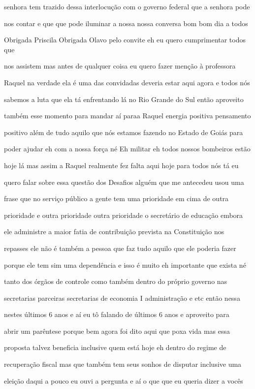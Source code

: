 \documentclass[a4paper,12pt]{article}
\begin{document}
senhora tem trazido dessa interlocução com o governo federal que a senhora pode

nos contar e que que pode iluminar a nossa nossa conversa bom bom dia a todos

Obrigada Priscila Obrigada Olavo pelo convite eh eu quero cumprimentar todos que

nos assistem mas antes de qualquer coisa eu quero fazer menção à professora

Raquel na verdade ela é uma das convidadas deveria estar aqui agora e todos nós

sabemos a luta que ela tá enfrentando lá no Rio Grande do Sul então aproveito

também esse momento para mandar aí paraa Raquel energia positiva pensamento

positivo além de tudo aquilo que nós estamos fazendo no Estado de Goiás para

poder ajudar eh com a nossa força né Eh militar eh todos nossos bombeiros estão

hoje lá mas assim a Raquel realmente fez falta aqui hoje para todos nós tá eu

quero falar sobre essa questão dos Desafios alguém que me antecedeu usou uma

frase que no serviço público a gente tem uma prioridade em cima de outra

prioridade e outra prioridade outra prioridade o secretário de educação embora

ele administre a maior fatia de contribuição prevista na Constituição nos

repasses ele não é também a pessoa que faz tudo aquilo que ele poderia fazer

porque ele tem sim uma dependência e isso é muito eh importante que exista né

tanto dos órgãos de controle como também dentro do próprio governo nas

secretarias parceiras secretarias de economia I administração e etc então nessa

nestes últimos 6 anos e aí eu tô falando de últimos 6 anos e aproveito para

abrir um parêntese porque bem agora foi dito aqui que poxa vida mas essa

proposta talvez beneficia inclusive quem está hoje eh dentro do regime de

recuperação fiscal mas que também tem seus sonhos de disputar inclusive uma

eleição daqui a pouco eu ouvi a pergunta e aí o que que eu queria dizer a vocês
\end{document}
